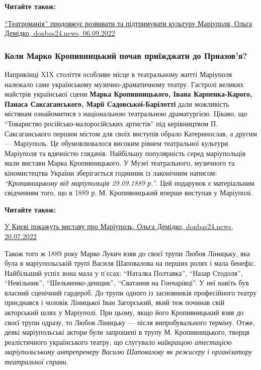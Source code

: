 \textbf{Читайте також:} 

\href{https://donbas24.news/news/teatromaniya-prodovzuje-rozvivati-ta-pidtrimuvati-kulturu-mariupolya}{\enquote{Театроманія} продовжує розвивати та підтримувати культуру Маріуполя, %
Ольга Демідко, donbas24.news, 06.09.2022}

\subsubsection{Коли Марко Кропивницький почав приїжджати до Приазов'я?}


Наприкінці XIX століття особливе місце в театральному житті Маріуполя належало
саме українському музично-драматичному театру. Гастролі великих майстрів
української сцени \textbf{Марка Кропивницького, Івана Карпенка-Карого, Панаса
Саксаганського, Марії Садовської-Барілотті} дали можливість містянам
ознайомитися з національною театральною драматургією. Цікаво, що \enquote{Товариство
російсько-малоросійських артистів} під керівництвом П. Саксаганського першим
містом для своїх виступів обрало Катеринослав, а другим — Маріуполь. Це
обумовлювалося високим рівнем театральної культури Маріуполя та вдячністю
глядачів. Найбільшу популярність серед маріупольців мали вистави Марка
Кропивницького. У Музеї театрального, музичного та кіномистецтва України
зберігається годинник із лаконічним написом: \emph{\enquote{Кропивницькому від маріупольців
29.09.1889 р.}}. Цей подарунок є матеріальним свідченням того, що в 1889 р. М.
Кропивницький вперше виступав у Маріуполі.

\textbf{Читайте також:} 

\href{https://archive.org/details/20_07_2022.demidko_olga.donbas24.u_kyevi_pokazhut_vystavu_pro_mariupol}{%
У Києві покажуть виставу про Маріуполь, Ольга Демідко, donbas24.news, 20.07.2022}


Також того ж 1889 року Марко Лукич взяв до своєї трупи Любов Ліницьку, яка була
в маріупольській трупі Василя Шаповалова на перших ролях і мала бенефіс.
Найбільший успіх вона мала у п'єсах: \enquote{Наталка Полтавка}, \enquote{Назар Стодоля},
\enquote{Невільник}, \enquote{Шельменко-денщик}, \enquote{Сватання на Гончарівці}. У неї навіть був
власний сценічний гардероб. До трупи одного із засновників професійного театру
приєднався і чоловік Ліницької Іван Загорський, який теж починав свій
акторський шлях у Маріуполі. При цьому, якщо його Кропивницький взяв до своєї
трупи одразу, то Любов Ліницьку — після випробувального терміну. Отже, деякі
маріупольські актори були запрошені в трупу М. Кропивницького, творця
реалістичного українського театру, що слугувало \emph{найкращою атестацією
маріупольському антрепренеру Василю Шаповалову як режисеру і організатору
театральної справи.}

